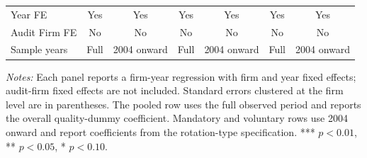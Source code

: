 \begin{table}[htbp]
\begin{threeparttable}
{\begin{tabular}{l cc cc cc}
Year FE & Yes & Yes & Yes & Yes & Yes & Yes \\
Audit Firm FE & No & No & No & No & No & No \\
Sample years & Full & 2004 onward & Full & 2004 onward & Full & 2004 onward \\
\bottomrule
\end{tabular}}
\begin{tablenotes}\footnotesize
\item \textit{Notes:} Each panel reports a firm-year regression with firm and year fixed effects; audit-firm fixed effects are not included. Standard errors clustered at the firm level are in parentheses. The pooled row uses the full observed period and reports the overall quality-dummy coefficient. Mandatory and voluntary rows use 2004 onward and report coefficients from the rotation-type specification. *** \(p<0.01\), ** \(p<0.05\), * \(p<0.10\).
\end{tablenotes}
\end{threeparttable}
\end{table}
